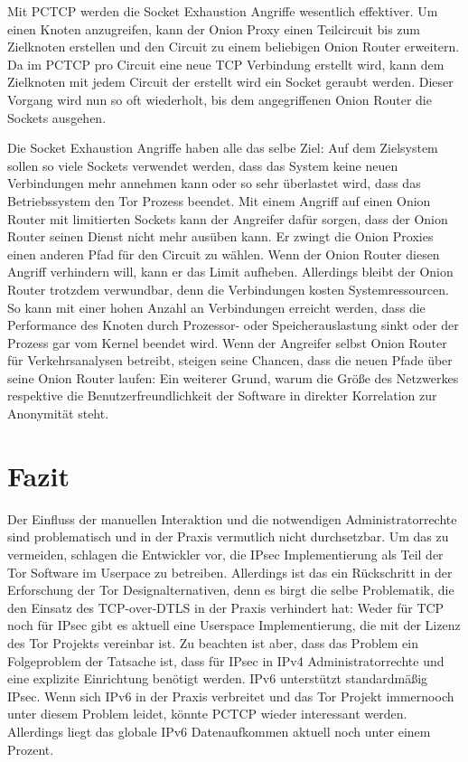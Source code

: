 \documentclass[fleqn,envcountsame,runningheads,10pt,a4paper]{llncs}
\begin{document}
Mit PCTCP werden die Socket Exhaustion Angriffe wesentlich effektiver. Um einen 
Knoten anzugreifen, kann der Onion Proxy einen Teilcircuit bis zum Zielknoten 
erstellen und den Circuit zu einem beliebigen Onion Router erweitern. Da im 
PCTCP pro Circuit eine neue TCP Verbindung erstellt wird, kann dem Zielknoten mit 
jedem Circuit der erstellt wird ein Socket geraubt werden. Dieser Vorgang wird 
nun so oft wiederholt, bis dem angegriffenen Onion Router die Sockets ausgehen.

Die Socket Exhaustion Angriffe haben alle das selbe Ziel: Auf dem Zielsystem 
sollen so viele Sockets verwendet werden, dass das System keine neuen 
Verbindungen mehr annehmen kann oder so sehr überlastet wird, dass das 
Betriebssystem den Tor Prozess beendet. Mit einem Angriff auf einen Onion Router 
mit limitierten Sockets kann der Angreifer dafür sorgen, dass der Onion Router 
seinen Dienst nicht mehr ausüben kann. Er zwingt die Onion Proxies einen anderen 
Pfad für den Circuit zu wählen. Wenn der Onion Router diesen Angriff verhindern 
will, kann er das Limit aufheben. Allerdings bleibt der Onion Router trotzdem 
verwundbar, denn die Verbindungen kosten  Systemressourcen. So kann mit einer 
hohen Anzahl an Verbindungen erreicht werden, dass die Performance des Knoten 
durch Prozessor- oder Speicherauslastung sinkt oder der Prozess gar vom Kernel 
beendet wird. Wenn der Angreifer selbst Onion Router für Verkehrsanalysen 
betreibt, steigen seine Chancen, dass die neuen Pfade über seine Onion Router 
laufen: Ein weiterer Grund, warum die Größe des Netzwerkes respektive die 
Benutzerfreundlichkeit der Software in direkter Korrelation zur Anonymität 
steht.
\section{Fazit}

Der Einfluss der manuellen Interaktion und die notwendigen Administratorrechte sind 
problematisch und in der Praxis vermutlich nicht durchsetzbar. Um das zu 
vermeiden, schlagen die Entwickler vor, die IPsec Implementierung als Teil der 
Tor Software im Userpace zu betreiben. Allerdings ist das ein Rückschritt in der 
Erforschung der Tor Designalternativen, denn es birgt die selbe Problematik, 
die den Einsatz des TCP-over-DTLS in der Praxis verhindert hat: Weder für TCP 
noch für IPsec gibt es aktuell eine Userspace Implementierung, die mit der 
Lizenz des Tor Projekts vereinbar ist. Zu beachten ist aber, dass das Problem 
ein Folgeproblem der Tatsache ist, dass für IPsec in IPv4 Administratorrechte und 
eine explizite Einrichtung benötigt werden. IPv6 unterstützt standardmäßig IPsec. Wenn
sich IPv6 in der Praxis verbreitet und das Tor Projekt immernooch unter diesem 
Problem leidet, könnte PCTCP wieder interessant werden. Allerdings liegt das 
globale IPv6 Datenaufkommen aktuell noch unter einem Prozent.
\end{document}
